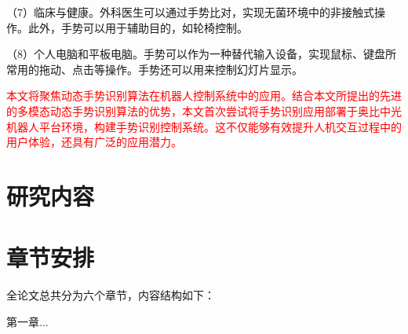 （7）临床与健康。外科医生可以通过手势比对，实现无菌环境中的非接触式操作\cite{strickland2013using}。此外，手势可以用于辅助目的，如轮椅控制\cite{zeng2012natural}。

（8）个人电脑和平板电脑。手势可以作为一种替代输入设备，实现鼠标、键盘所常用的拖动、点击等操作。手势还可以用来控制幻灯片显示\cite{starner1998real}。

\textcolor{red}{本文将聚焦动态手势识别算法在机器人控制系统中的应用。结合本文所提出的先进的多模态动态手势识别算法的优势，本文首次尝试将手势识别应用部署于奥比中光机器人平台环境，构建手势识别控制系统。这不仅能够有效提升人机交互过程中的用户体验，还具有广泛的应用潜力。}



\section{研究内容}



\section{章节安排}

全论文总共分为六个章节，内容结构如下：

第一章...

